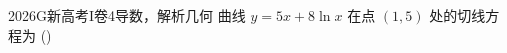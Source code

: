 
\begin{problem}{2026}{G}{新高考I卷}{4}{导数，解析几何}
曲线 $ y=5x+8\ln x $ 在点 $ (1,5) $ 处的切线方程为 (\hspace{1cm})
\begin{choices}
\end{choices}
\end{problem}

\begin{answer}
\end{answer}

\begin{solutions}
\end{solutions}